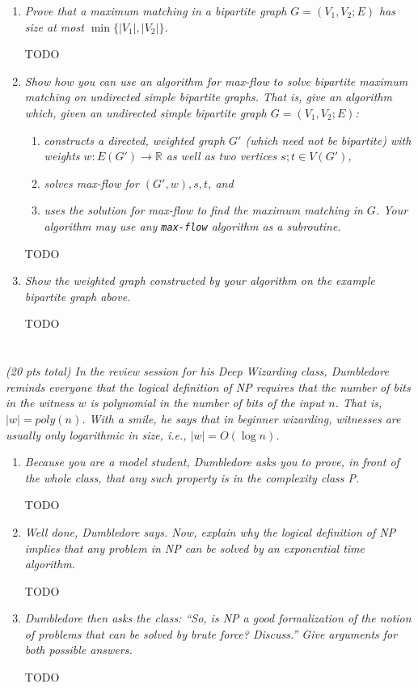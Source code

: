 \documentclass[12pt]{article} \setlength{\oddsidemargin}{0in}
\begin{document}
\begin{enumerate}
\item\textit{Prove that a maximum matching in a bipartite graph $G = (V_1, V_2; E)$ has size at most $\min\{|V_1|,|V_2|\}$.}

TODO

\item\textit{Show how you can use an algorithm for max-flow to solve bipartite maximum
matching on undirected simple bipartite graphs. That is, give an algorithm which, given an undirected simple bipartite graph $G = (V_1, V_2; E)$:}
\begin{enumerate}[label = (\arabic*)]
\item\textit{constructs a directed, weighted graph $G'$ (which need not be bipartite) with weights $w : E(G') \rightarrow \mathbb{R}$ as well as two vertices $s; t \in V(G')$,}
\item\textit{solves max-flow for $(G',w), s, t$, and}
\item\textit{uses the solution for max-flow to find the maximum matching in $G$. Your algorithm may use any \texttt{max-flow} algorithm as a subroutine.}
\end{enumerate}

TODO

\item\textit{Show the weighted graph constructed by your algorithm on the example bipartite graph above.}

TODO

\end{enumerate}

\section{}
\textit{(20 pts total) In the review session for his Deep Wizarding class, Dumbledore reminds everyone that the logical definition of NP requires that the number of bits in the witness $w$ is polynomial in the number of bits of the input $n$. That is, $|w| = poly(n)$. With a smile, he says that in beginner wizarding, witnesses are usually only logarithmic in size, i.e., $|w| = O(\log n)$.}
\begin{enumerate}
\item\textit{Because you are a model student, Dumbledore asks you to prove, in front of the whole class, that any such property is in the complexity class P.}

TODO

\item\textit{Well done, Dumbledore says. Now, explain why the logical definition of NP implies that any problem in NP can be solved by an exponential time algorithm.}

TODO

\item\textit{Dumbledore then asks the class: ``So, is NP a good formalization of the notion of problems that can be solved by brute force? Discuss.'' Give arguments for both possible answers.}

TODO

\end{enumerate}
\end{document}
